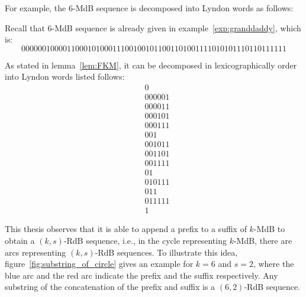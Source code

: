 For example, the $6$-MdB sequence is decomposed into Lyndon words as follows:
\begin{example}
    Recall that $6$-MdB sequence is already given in example~\ref{exp:granddaddy}, which is:
    \[0000001000011000101000111001001011001101001111010101110110111111\]

    As stated in lemma~\ref{lem:FKM}, it can be decomposed in lexicographically order into Lyndon words listed follows:
    \begin{align*}
        &0\\
        &000001\\
        &000011\\
        &000101\\
        &000111\\
        &001\\
        &001011\\
        &001101\\
        &001111\\
        &01\\
        &010111\\
        &011\\
        &011111\\
        &1
    \end{align*}
\end{example}


This thesis observes that it is able to append a prefix to a suffix of $k$-MdB to obtain a $(k,s)$-RdB sequence, i.e., in the cycle representing $k$-MdB, there are arcs representing $(k,s)$-RdB sequences. To illustrate this idea, figure~\ref{fig:substring_of_circle} gives an example for $k=6$ and $s=2$, where the blue arc and the red arc indicate the prefix and the suffix respectively. Any substring of the concatenation of the prefix and suffix is a $(6,2)$-RdB sequence.

